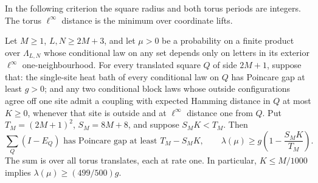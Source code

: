 In the following criterion the square radius and both torus periods
are integers.  The torus \(\ell^\infty\) distance is the minimum
over coordinate lifts.

\begin{theorem}\label{t:periodic}
Let \(M\ge1\), \(L,N\ge2M+3\), and let \(\mu>0\) be a
probability on a finite product over \(\Lambda_{L,N}\) whose
conditional law on any set depends only on letters in its exterior
\(\ell^\infty\) one-neighbourhood.
For every translated square \(Q\) of side \(2M+1\), suppose that:
the single-site heat bath of every conditional law on \(Q\) has Poincare gap at least
\(g>0\); and any two conditional block laws whose outside
configurations agree off one site admit a coupling with expected
Hamming distance in \(Q\) at most \(K\ge0\), whenever that site is
outside and at \(\ell^\infty\) distance one from \(Q\).
Put \(T_M=(2M+1)^2\), \(S_M=8M+8\), and suppose \(S_MK<T_M\).
Then
\[
 \sum_{Q}(I-E_Q)\text{ has Poincare gap at least }T_M-S_MK,\qquad
 \lambda(\mu)\ge g\left(1-\frac{S_MK}{T_M}\right).
\]
The sum is over all torus translates, each at rate one.
In particular, \(K\le M/1000\) implies
\(\lambda(\mu)\ge(499/500)g\).
\end{theorem}

